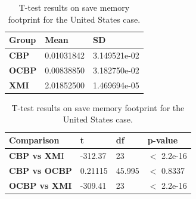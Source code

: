 \documentclass{llncs}
\begin{document}
    
    \begin{table}[ht]
        \centering
        \label{table:ttest_save_memory_wikipedia}
        \caption{T-test results on save memory footprint for the United States case.}
        \begin{minipage}{0.44\textwidth}
            \centering
            \begin{tabular}{|p{}|p{}|p{}|}
                \hline 
                \textbf{Group}  & \textbf{Mean} & \textbf{SD} \\ 
                \hline 
                \textbf{CBP} & 0.01031842     & 3.149521e-02 \\ 
                \hline 
                \textbf{OCBP} & 0.00838850  & 3.182750e-02 \\ 
                \hline 
                \textbf{XMI} &  2.01852500  & 1.469694e-05 \\ 
                \hline 
            \end{tabular} 
        \end{minipage}
        \hfill
        \begin{minipage}{0.54\textwidth}
            \centering
            \begin{tabular}{|p{}|p{}|p{}|p{}|}
                \hline 
                \textbf{Comparison} & \textbf{t}  & \textbf{df} & \textbf{p-value} \\ 
                \hline 
                \textbf{CBP vs XM}I & -312.37   &23 & $<$ 2.2e-16 \\ 
                \hline 
                \textbf{CBP vs OCBP} &0.21115 &45.995 & $<$ 0.8337 \\ 
                \hline 
                \textbf{OCBP vs XMI} &-309.41  &23 & $<$ 2.2e-16 \\ 
                \hline 
            \end{tabular} 
        \end{minipage}
    \end{table}
\end{document}
